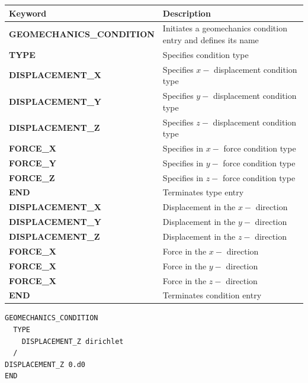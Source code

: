 \begin{center}
\begin{tabularx}{\linewidth}{lX}
\toprule[1.5pt]
\bf Keyword & \bf Description\\
\midrule
\bf GEOMECHANICS\_CONDITION & Initiates a geomechanics condition entry and defines its name\\
\midrule
\bf TYPE & Specifies condition type\\
\midrule
    \bf DISPLACEMENT\_X & Specifies $x-$ displacement condition type\\
    \bf DISPLACEMENT\_Y & Specifies $y-$ displacement condition type\\
    \bf DISPLACEMENT\_Z & Specifies $z-$ displacement condition type\\
    \bf FORCE\_X & Specifies in $x-$ force condition type\\
    \bf FORCE\_Y & Specifies in $y-$ force condition type\\
    \bf FORCE\_Z & Specifies in $z-$ force condition type\\
    \bf END & Terminates type entry\\
\toprule[1.5pt]
\bf DISPLACEMENT\_X & Displacement in the $x-$ direction \\ 
\bf DISPLACEMENT\_Y & Displacement in the $y-$ direction \\ 
\bf DISPLACEMENT\_Z & Displacement in the $z-$ direction \\ 
\bf FORCE\_X & Force in the $x-$ direction \\ 
\bf FORCE\_X & Force in the $y-$ direction \\ 
\bf FORCE\_X & Force in the $z-$ direction \\ 
\bf END & Terminates condition entry\\
\bottomrule[1.5pt]
\end{tabularx}
\end{center}


\begin{mdframed}


\footnotesize

\begin{verbatim}
GEOMECHANICS_CONDITION
  TYPE
    DISPLACEMENT_Z dirichlet
  /
DISPLACEMENT_Z 0.d0
END

\end{verbatim}
\normalsize
\end{mdframed}

\hyperlink{target_key}{\return}


